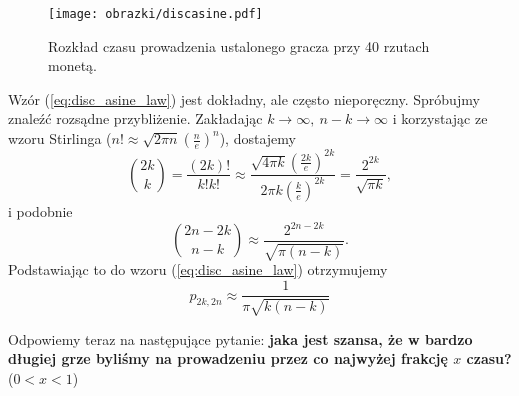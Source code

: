 \documentclass[a4paper,11pt,twoside]{book}
\newcommand{\conv}{\rightarrow}
\theoremstyle{definition}
\begin{document}
\begin{figure}[ht]
 \centering
 \texttt{[image: obrazki/discasine.pdf]}
 \caption{Rozkład czasu prowadzenia ustalonego gracza przy 40 rzutach monetą.}
 \label{fig:disc_asine}
\end{figure}

Wzór (\ref{eq:disc_asine_law}) jest dokładny, ale często nieporęczny. Spróbujmy znaleźć rozsądne przybliżenie. Zakładając $k \conv \infty,\ n-k \conv \infty$ i korzystając ze wzoru Stirlinga ($n! \approx \sqrt{2\pi n} \left( \frac{n}{e} \right)^n$), dostajemy
\[ \binom{2k}{k} = \frac{(2k)!}{k! k!} \approx \frac{\sqrt{4\pi k} \left( \frac{2k}{e} \right)^{2k}}{2\pi k \left( \frac{k}{e} \right)^{2k}} = \frac{2^{2k}}{\sqrt{\pi k}}, \]
i podobnie
\[ \binom{2n-2k}{n-k} \approx \frac{2^{2n-2k}}{\sqrt{\pi (n-k)}}. \]
Podstawiając to do wzoru (\ref{eq:disc_asine_law}) otrzymujemy
\begin{equation}
  \label{eq:disc_asine_approx}
   p_{2k,2n} \approx \frac{1}{\pi \sqrt{k(n-k)}}
\end{equation}


Odpowiemy teraz na następujące pytanie: \textbf{jaka jest szansa, że w bardzo długiej grze byliśmy na prowadzeniu przez co najwyżej frakcję $x$ czasu?} ($0 < x < 1$)
\end{document}
